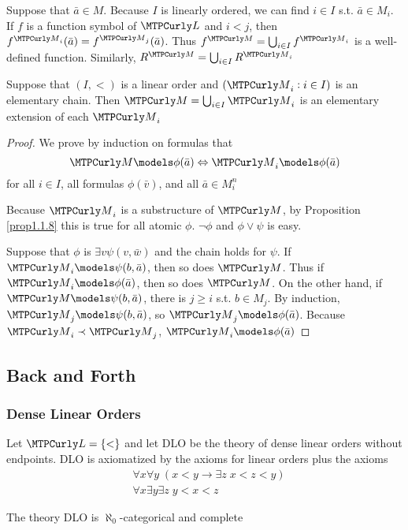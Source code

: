 \documentclass[11pt]{article}
\begin{document}
Suppose that \(\bar{a}\in M\). Because \(I\) is linearly ordered, we can find
\(i\in I\) s.t. \(\bar{a}\in M_i\). If \(f\) is a function symbol of
\(\call\) and \(i<j\), then \(f^{\calm_i}(\bar{a})=f^{\calm_j}(\bar{a})\).
Thus \(f^\calm=\bigcup_{i\in I}f^{\calm_i}\) is a well-defined function.
Similarly, \(R^\calm=\bigcup_{i\in I}R^{\calm_i}\)

\begin{proposition}[]
Suppose that \((I,<)\) is a linear order and \((\calm_i:i\in I)\) is an
elementary chain. Then \(\calm=\bigcup_{i\in I}\calm_i\) is an elementary
extension of each \(\calm_i\)
\end{proposition}

\begin{proof}
We prove by induction on formulas that 
\begin{equation*}
\calm\models\phi(\bar{a})\Leftrightarrow\calm_i\models\phi(\bar{a})
\end{equation*}
for all \(i\in I\), all formulas \(\phi(\bar{v})\), and all \(\bar{a}\in M_i^n\) 

Because \(\calm_i\) is a substructure of \(\calm\), by Proposition
\ref{prop1.1.8} this is true for all atomic \(\phi\). \(\neg\phi\) and
\(\phi\vee\psi\) is easy.

Suppose that \(\phi\) is \(\exists v\psi(v,\bar{w})\) and the chain holds for
\(\psi\). If \(\calm_i\models\psi(b,\bar{a})\), then so does \(\calm\). Thus if
\(\calm_i\models\phi(\bar{a})\), then so does \(\calm\). On the other hand,
if \(\calm\models\psi(b,\bar{a})\), there is \(j\ge i\) s.t. \(b\in M_j\). By
induction, \(\calm_j\models\psi(b,\bar{a})\), so
\(\calm_j\models\phi(\bar{a})\). Because \(\calm_i\prec\calm_j\), \(\calm_i\models\phi(\bar{a})\)
\end{proof}


\subsection{Back and Forth}
\label{sec:org41d5673}

\subsubsection{Dense Linear Orders}
\label{sec:org88169cd}
Let \(\call=\{<\}\) and let DLO be the theory of dense linear orders without
endpoints. DLO is axiomatized by the axioms for linear orders plus the
axioms
\begin{align*}
&\forall x\forall y\;(x<y\to \exists z\;x<z<y)\\
&\forall x\exists y\exists z\; y<x<z
\end{align*}
\begin{theorem}[]
\label{thm2.4.1}
The theory DLO is \(\aleph_0\)-categorical and complete
\end{theorem}
\end{document}
